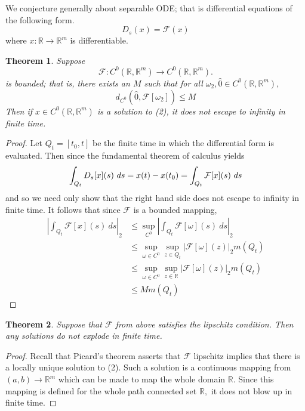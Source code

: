 \documentclass[letter]{article}
\newtheorem{theorem}{Theorem}
\newenvironment{menumerate}{%
  \edef\backupindent{\the\parindent}%
  \enumerate%
  \setlength{\parindent}{\backupindent}%
}{\endenumerate}
\begin{document}
\begin{menumerate}
\item We conjecture generally about separable ODE; that is differential equations of the following form.
    \begin{equation}
        D_s(x) = \mathcal{F}(x)
    \end{equation}
        where $x: \mathbb{R} \to \mathbb{R}^m$ is differentiable.
    \begin{theorem}
        Suppose $$\mathcal{F}: C^0(\mathbb{R}, \mathbb{R}^m) \to C^0(\mathbb{R}, \mathbb{R}^m).$$ is bounded;
        that is, there exists an $M$ such that for all $\omega_2, \hat 0 \in C^0(\mathbb{R}, \mathbb{R}^m),$
        \begin{equation}
            d_{C^0}\left(\hat0,\mathcal{F}[\omega_2]\right) \leq M
        \end{equation}
        Then if $x \in C^0(\mathbb{R}, \mathbb{R}^m)$ is a solution to (2), it does not escape to
        infinity in finite time.
    \end{theorem}
    \begin{proof}
        Let $Q_t = [t_0, t]$ be the finite time in which the differential form is evaluated.
        Then since the fundamental theorem of calculus yields
        \begin{equation}
                \int_{Q_t} D_s[x](s)\ ds = x(t) - x(t_0) = \int_{Q_t} \mathcal{F}[x](s)\ ds\\
        \end{equation}
        and so we need only show that the right hand side does not escape to infinity in finite time.
        It follows that since $\mathcal{F}$ is a bounded mapping, 
        \begin{equation}
            \begin{aligned}
                \left |\int_{Q_t} \mathcal{F}[x](s)\  ds \right|_2
                     &\leq \sup_{C^0} \left| \int_{Q_t} \mathcal{F}[\omega](s)\  ds \right|_2\\
                &\leq \sup_{\omega \in C^0} \sup_{z \in Q_t} |\mathcal{F}[\omega](z)|_2 m(Q_t) \\
                &\leq \sup_{\omega\in C^0} \sup_{z \in \mathbb{R}} |\mathcal{F}[\omega](z)|_2 m(Q_t)\\
                &\leq Mm(Q_t) 
            \end{aligned}
        \end{equation}
    \end{proof}

    \begin{theorem}
        Suppose that $\mathcal{F}$ from above satisfies the lipschitz condition. Then any solutions
        do not explode in finite time.
    \end{theorem}
    \begin{proof}
        Recall that Picard's theorem asserts that $\mathcal{F}$ lipschitz implies that there is a locally
        unique solution to (2). Such a solution is a continuous mapping from $(a,b) \to \mathbb{R}^m$
        which can be made to map the whole domain $\mathbb{R}.$ Since this mapping is defined for the whole path connected
        set $\mathbb{R},$ it does not blow up in finite time.
    \end{proof}


\end{menumerate}
\end{document}
